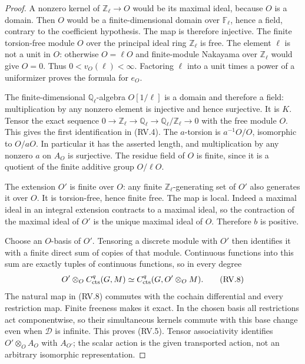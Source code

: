 \begin{proof}
A nonzero kernel of $\mathbb Z_\ell\to O$ would be its maximal
ideal, because $O$ is a domain.  Then $O$ would be a finite-dimensional
domain over $\mathbb F_\ell$, hence a field, contrary to the
coefficient hypothesis.  The map is therefore injective.
The finite torsion-free module $O$ over the principal ideal ring
$\mathbb Z_\ell$ is free.  The element $\ell$ is not a unit in $O$:
otherwise $O=\ell O$ and finite-module Nakayama over $\mathbb Z_\ell$
would give $O=0$.  Thus $0<v_O(\ell)<\infty$.
Factoring $\ell$ into a unit times a power of a uniformizer proves
the formula for $e_O$.

The finite-dimensional $\mathbb Q_\ell$-algebra $O[1/\ell]$ is a
domain and therefore a field: multiplication by any nonzero element
is injective and hence surjective.  It is $K$.
Tensor the exact sequence
$0\to\mathbb Z_\ell\to\mathbb Q_\ell\to
\mathbb Q_\ell/\mathbb Z_\ell\to0$ with the free module $O$.
This gives the first identification in (RV.4).
The $a$-torsion is $a^{-1}O/O$, isomorphic to $O/aO$.
In particular it has the asserted length, and multiplication by any
nonzero $a$ on $A_O$ is surjective.
The residue field of $O$ is finite, since it is a quotient of the
finite additive group $O/\ell O$.

The extension $O'$ is finite over $O$: any finite
$\mathbb Z_\ell$-generating set of $O'$ also generates it over $O$.
It is torsion-free, hence finite free.  The map is local.
Indeed a maximal ideal in an integral extension contracts to a
maximal ideal, so the contraction of the maximal ideal of $O'$ is
the unique maximal ideal of $O$.  Therefore $b$ is positive.

Choose an $O$-basis of $O'$.  Tensoring a discrete module with $O'$
then identifies it with a finite direct sum of copies of that module.
Continuous functions into this sum are exactly tuples of continuous
functions, so in every degree
\[
 O'\otimes_O C^q_{\rm cts}(G,M)
        \simeq C^q_{\rm cts}(G,O'\otimes_O M).
 \tag{RV.8}
\]
The natural map in (RV.8) commutes with the cochain differential
and every restriction map.  Finite freeness makes it exact.
In the chosen basis all restrictions act componentwise, so their
simultaneous kernels commute with this base change even when
$\mathscr D$ is infinite.  This proves (RV.5).
Tensor associativity identifies $O'\otimes_O A_O$ with $A_{O'}$;
the scalar action is the given transported action, not an arbitrary
isomorphic representation.


\end{proof}
